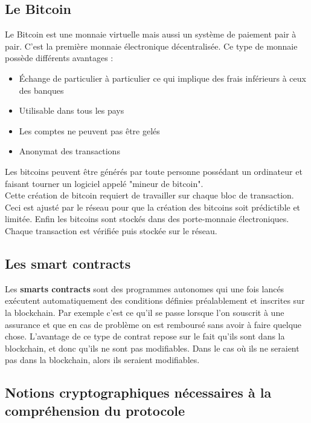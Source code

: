 \documentclass[conference]{IEEEtran}
\begin{document}
\subsection{Le Bitcoin}

Le Bitcoin est une monnaie virtuelle mais aussi un système de paiement pair à pair. C'est la première monnaie électronique décentralisée. Ce type de monnaie possède différents avantages : 
\begin{itemize}
    \item Échange de particulier à particulier ce qui implique des frais inférieurs à ceux des banques
    \item Utilisable dans tous les pays
    \item Les comptes ne peuvent pas être gelés
    \item Anonymat des transactions
\end{itemize}
\vspace{0.3cm}

Les bitcoins peuvent être générés par toute personne possédant un ordinateur et faisant tourner un logiciel appelé "mineur de bitcoin". \\Cette création de bitcoin requiert de travailler sur chaque bloc de transaction. Ceci est ajusté par le réseau pour que la création des bitcoins soit prédictible et limitée. Enfin les bitcoins sont stockés dans des porte-monnaie électroniques. Chaque transaction est vérifiée puis stockée sur le réseau.

\vspace{0.3cm}

\subsection{Les smart contracts}
Les \textbf{smarts contracts} sont des programmes autonomes qui une fois lancés exécutent automatiquement des conditions définies préalablement et inscrites sur la blockchain. Par exemple c'est ce qu'il se passe lorsque l'on souscrit à une assurance et que en cas de problème on est remboursé sans avoir à faire quelque chose.
L'avantage de ce type de contrat repose sur le fait qu'ils sont dans la blockchain, et donc qu'ils ne sont pas modifiables. Dans le cas où ils ne seraient pas dans la blockchain, alors ils seraient modifiables.

\vspace{0.3cm}
\subsection{Notions cryptographiques nécessaires à la compréhension du protocole}
\end{document}
